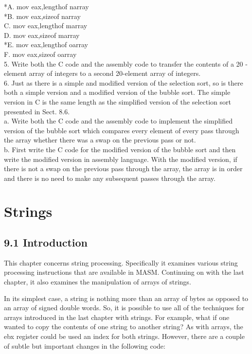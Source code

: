 \documentclass[10pt]{article}
\begin{document}
*A. mov eax,lengthof narray\\
*B. mov eax,sizeof narray\\
C. mov eax,lengthof marray\\
D. mov eax,sizeof marray\\
*E. mov eax,lengthof oarray\\
F. mov eax,sizeof oarray\\
5. Write both the C code and the assembly code to transfer the contents of a 20 -element array of integers to a second 20-element array of integers.\\
6. Just as there is a simple and modified version of the selection sort, so is there both a simple version and a modified version of the bubble sort. The simple version in C is the same length as the simplified version of the selection sort presented in Sect. 8.6.\\
a. Write both the C code and the assembly code to implement the simplified version of the bubble sort which compares every element of every pass through the array whether there was a swap on the previous pass or not.\\
b. First write the C code for the modified version of the bubble sort and then write the modified version in assembly language. With the modified version, if there is not a swap on the previous pass through the array, the array is in order and there is no need to make any subsequent passes through the array.

\section*{Strings}
\subsection*{9.1 Introduction}
This chapter concerns string processing. Specifically it examines various string processing instructions that are available in MASM. Continuing on with the last chapter, it also examines the manipulation of arrays of strings.

In its simplest case, a string is nothing more than an array of bytes as opposed to an array of signed double words. So, it is possible to use all of the techniques for arrays introduced in the last chapter with strings. For example, what if one wanted to copy the contents of one string to another string? As with arrays, the ebx register could be used an index for both strings. However, there are a couple of subtle but important changes in the following code:
\end{document}
